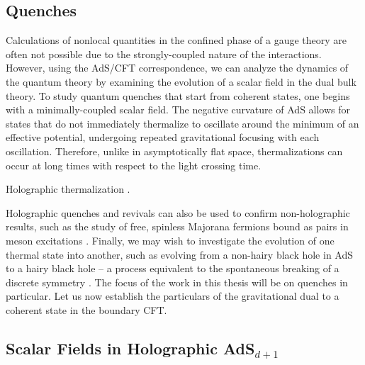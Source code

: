 \documentclass[../PhD.tex]{subfiles}
\begin{document}

\subsection{Quenches}
\label{sub: quenches}

Calculations of nonlocal quantities in the confined phase of a gauge theory are often not possible due to the strongly-coupled nature of the interactions. However, using the AdS/CFT correspondence, we can analyze the dynamics of the quantum theory by examining the evolution of a scalar field in the dual bulk theory. To study quantum quenches that start from coherent states, one begins with a minimally-coupled scalar field. The negative curvature of AdS allows for states that do not immediately thermalize to oscillate around the minimum of an effective potential, undergoing repeated gravitational focusing with each oscillation. Therefore, unlike in asymptotically flat space, thermalizations can occur at long times with respect to the light crossing time. 

Holographic thermalization \cite{1103.2683}.

Holographic quenches and revivals can also be used to confirm non-holographic results, such as the study of free, spinless Majorana fermions bound as pairs in meson excitations \cite{1706.02438}. Finally, we may wish to investigate the evolution of one thermal state into another, such as evolving from a non-hairy black hole in AdS to a hairy black hole -- a process equivalent to the spontaneous breaking of a discrete symmetry \cite{1704.05454}. The focus of the work in this thesis will be on quenches in particular. Let us now establish the particulars of the gravitational dual to a coherent state in the boundary CFT. 


\subsection{Scalar Fields in Holographic AdS$_{d+1}$}
\label{ssec: scalar fields}
\end{document}
